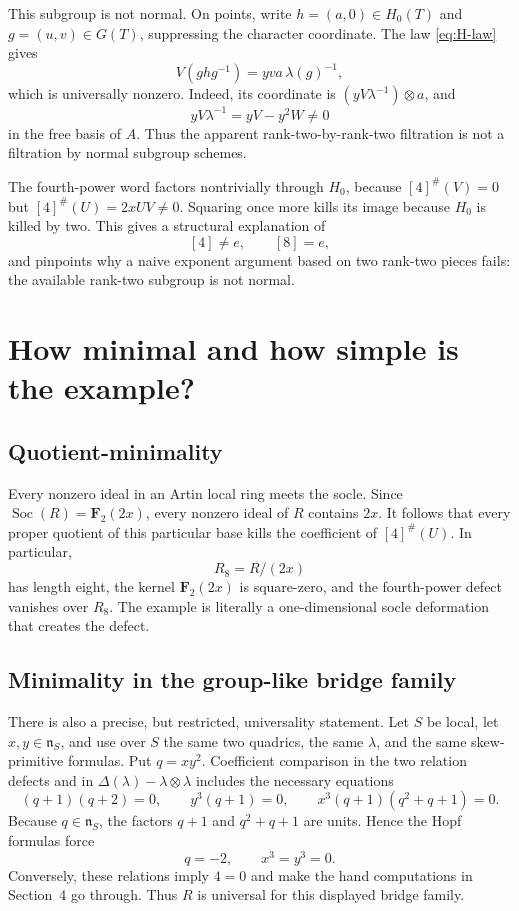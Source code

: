 \documentclass[11pt]{article}
\theoremstyle{remark}
\newcommand{\F}{\mathbf F}
\newcommand{\Soc}{\operatorname{Soc}}
\newcommand{\n}{\mathfrak n}
\newcommand{\ot}{\otimes}
\begin{document}
This subgroup is not normal.  On points, write $h=(a,0)\in H_0(T)$ and
$g=(u,v)\in G(T)$, suppressing the character coordinate.  The law
\eqref{eq:H-law} gives
\begin{equation}\label{eq:conjugation}
 V(ghg^{-1})=yva\,\lambda(g)^{-1},
\end{equation}
which is universally nonzero.  Indeed, its coordinate is
$(yV\lambda^{-1})\otimes a$, and
\[
 yV\lambda^{-1}=yV-y^2W\ne0
\]
in the free basis of $A$.  Thus the apparent rank-two-by-rank-two
filtration is not a filtration by normal subgroup schemes.

The fourth-power word factors nontrivially through $H_0$, because
$[4]^\#(V)=0$ but $[4]^\#(U)=2xUV\ne0$.  Squaring once more kills its image
because $H_0$ is killed by two.  This gives a structural explanation of
\[
 [4]\ne e,\qquad[8]=e,
\]
and pinpoints why a naive exponent argument based on two rank-two pieces
fails: the available rank-two subgroup is not normal.

\section{How minimal and how simple is the example?}

\subsection{Quotient-minimality}

Every nonzero ideal in an Artin local ring meets the socle.  Since
$\Soc(R)=\F_2(2x)$, every nonzero ideal of $R$ contains $2x$.  It follows
that every proper quotient of this particular base kills the coefficient
of $[4]^\#(U)$.  In particular,
\[
 R_8=R/(2x)
\]
has length eight, the kernel $\F_2(2x)$ is square-zero, and the fourth-power
defect vanishes over $R_8$.  The example is literally a one-dimensional
socle deformation that creates the defect.

\subsection{Minimality in the group-like bridge family}

There is also a precise, but restricted, universality statement.  Let $S$
be local, let $x,y\in\n_S$, and use over $S$ the same two quadrics, the same
$\lambda$, and the same skew-primitive formulas.  Put $q=xy^2$.  Coefficient
comparison in the two relation defects and in
$\Delta(\lambda)-\lambda\ot\lambda$ includes the necessary equations
\begin{equation}\label{eq:forcing}
 (q+1)(q+2)=0,
 \qquad y^3(q+1)=0,
 \qquad x^3(q+1)(q^2+q+1)=0.
\end{equation}
Because $q\in\n_S$, the factors $q+1$ and $q^2+q+1$ are units.  Hence the
Hopf formulas force
\[
 q=-2,\qquad x^3=y^3=0.
\]
Conversely, these relations imply $4=0$ and make the hand computations in
Section~4 go through.  Thus $R$ is universal for this displayed bridge
family.
\end{document}

